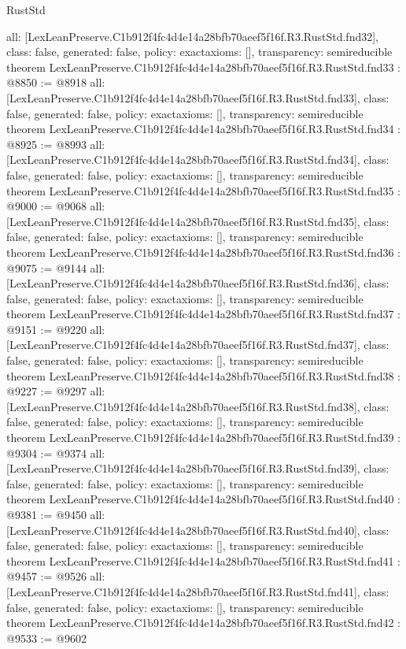 \begin{lexlean}{RustStd}
\begin{coremodule}
{  all: [LexLeanPreserve.C1b912f4fc4d4e14a28bfb70aeef5f16f.R3.RustStd.fnd32],
  class: false,
  generated: false,
  policy: exact{axioms: []},
  transparency: semireducible
}
theorem LexLeanPreserve.C1b912f4fc4d4e14a28bfb70aeef5f16f.R3.RustStd.fnd33 : @8850 := @8918 {
  all: [LexLeanPreserve.C1b912f4fc4d4e14a28bfb70aeef5f16f.R3.RustStd.fnd33],
  class: false,
  generated: false,
  policy: exact{axioms: []},
  transparency: semireducible
}
theorem LexLeanPreserve.C1b912f4fc4d4e14a28bfb70aeef5f16f.R3.RustStd.fnd34 : @8925 := @8993 {
  all: [LexLeanPreserve.C1b912f4fc4d4e14a28bfb70aeef5f16f.R3.RustStd.fnd34],
  class: false,
  generated: false,
  policy: exact{axioms: []},
  transparency: semireducible
}
theorem LexLeanPreserve.C1b912f4fc4d4e14a28bfb70aeef5f16f.R3.RustStd.fnd35 : @9000 := @9068 {
  all: [LexLeanPreserve.C1b912f4fc4d4e14a28bfb70aeef5f16f.R3.RustStd.fnd35],
  class: false,
  generated: false,
  policy: exact{axioms: []},
  transparency: semireducible
}
theorem LexLeanPreserve.C1b912f4fc4d4e14a28bfb70aeef5f16f.R3.RustStd.fnd36 : @9075 := @9144 {
  all: [LexLeanPreserve.C1b912f4fc4d4e14a28bfb70aeef5f16f.R3.RustStd.fnd36],
  class: false,
  generated: false,
  policy: exact{axioms: []},
  transparency: semireducible
}
theorem LexLeanPreserve.C1b912f4fc4d4e14a28bfb70aeef5f16f.R3.RustStd.fnd37 : @9151 := @9220 {
  all: [LexLeanPreserve.C1b912f4fc4d4e14a28bfb70aeef5f16f.R3.RustStd.fnd37],
  class: false,
  generated: false,
  policy: exact{axioms: []},
  transparency: semireducible
}
theorem LexLeanPreserve.C1b912f4fc4d4e14a28bfb70aeef5f16f.R3.RustStd.fnd38 : @9227 := @9297 {
  all: [LexLeanPreserve.C1b912f4fc4d4e14a28bfb70aeef5f16f.R3.RustStd.fnd38],
  class: false,
  generated: false,
  policy: exact{axioms: []},
  transparency: semireducible
}
theorem LexLeanPreserve.C1b912f4fc4d4e14a28bfb70aeef5f16f.R3.RustStd.fnd39 : @9304 := @9374 {
  all: [LexLeanPreserve.C1b912f4fc4d4e14a28bfb70aeef5f16f.R3.RustStd.fnd39],
  class: false,
  generated: false,
  policy: exact{axioms: []},
  transparency: semireducible
}
theorem LexLeanPreserve.C1b912f4fc4d4e14a28bfb70aeef5f16f.R3.RustStd.fnd40 : @9381 := @9450 {
  all: [LexLeanPreserve.C1b912f4fc4d4e14a28bfb70aeef5f16f.R3.RustStd.fnd40],
  class: false,
  generated: false,
  policy: exact{axioms: []},
  transparency: semireducible
}
theorem LexLeanPreserve.C1b912f4fc4d4e14a28bfb70aeef5f16f.R3.RustStd.fnd41 : @9457 := @9526 {
  all: [LexLeanPreserve.C1b912f4fc4d4e14a28bfb70aeef5f16f.R3.RustStd.fnd41],
  class: false,
  generated: false,
  policy: exact{axioms: []},
  transparency: semireducible
}
theorem LexLeanPreserve.C1b912f4fc4d4e14a28bfb70aeef5f16f.R3.RustStd.fnd42 : @9533 := @9602 {
}
\end{coremodule}
\end{lexlean}
